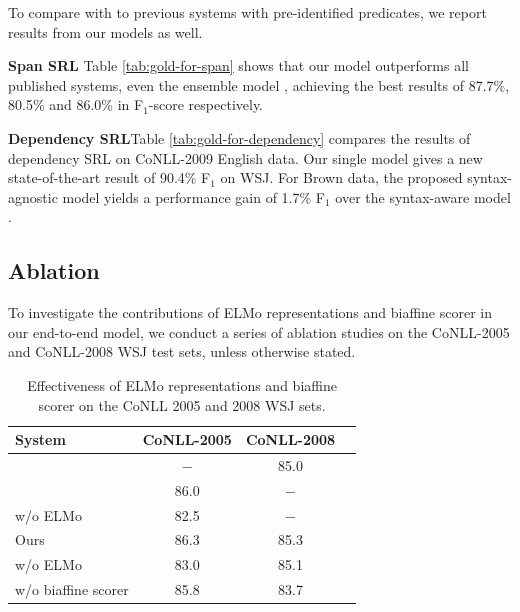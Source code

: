 \documentclass[letterpaper]{article} %
\begin{document}
To compare with to previous systems with pre-identified predicates, we report results from our models as well.

\noindent \textbf{Span SRL}\quad 
Table \ref{tab:gold-for-span} shows that our model outperforms all published systems, even the ensemble model \cite{selfatt2018}, achieving the best results of 87.7\%, 80.5\% and 86.0\% in F$_1$-score respectively. %


\noindent \textbf{Dependency SRL}\quad Table \ref{tab:gold-for-dependency} compares the results of dependency SRL on CoNLL-2009 English data. Our single model gives a new state-of-the-art result of 90.4\% F$_1$ on WSJ. For Brown data, the proposed syntax-agnostic model yields a performance gain of 1.7\% F$_1$ over the syntax-aware model \cite{li2018unified}.%

\subsection{Ablation}
To investigate the contributions of ELMo representations and biaffine scorer in our end-to-end model, we conduct a series of ablation studies on the CoNLL-2005 and CoNLL-2008 WSJ test sets, unless otherwise stated.

\begin{table}
	\centering
	\begin{tabular}{lccc}
		\toprule
		System & CoNLL-2005& CoNLL-2008\\
		\midrule
		\citeauthor{cai2018full} \shortcite{cai2018full} & $-$ & 85.0  \\
		\midrule
		\citeauthor{he2018jointly} \shortcite{he2018jointly} & 86.0 & $-$ \\
		w/o ELMo & 82.5 & $-$ \\ 
		\midrule
		Ours & 86.3 & 85.3 \\
		w/o ELMo & 83.0 & 85.1 \\
		w/o biaffine scorer & 85.8 & 83.7 \\
		\bottomrule
	\end{tabular}
	\caption{Effectiveness of ELMo representations and biaffine scorer on the CoNLL 2005 and 2008 WSJ sets.}\label{ablation:elmo}
\end{table}
\end{document}
